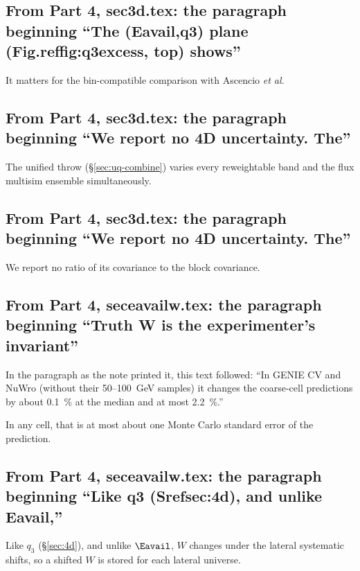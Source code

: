 \subsection{From Part 4, sec3d.tex: the paragraph beginning ``The (Eavail,q3) plane (Fig.reffig:q3excess, top) shows''}
It matters for the bin-compatible comparison with Ascencio \emph{et al.}

\subsection{From Part 4, sec3d.tex: the paragraph beginning ``We report no 4D uncertainty. The''}
The unified throw (\S\ref{sec:uq-combine}) varies every reweightable band and the flux multisim ensemble simultaneously.

\subsection{From Part 4, sec3d.tex: the paragraph beginning ``We report no 4D uncertainty. The''}
We report no ratio of its covariance to the block covariance.

\subsection{From Part 4, seceavailw.tex: the paragraph beginning ``Truth W is the experimenter's invariant''}
In the paragraph as the note printed it, this text followed: ``In GENIE CV and NuWro (without their 50--\SI{100}{GeV} samples) it changes the coarse-cell predictions by about \SI{0.1}{\percent} at the median and at most \SI{2.2}{\percent}.''\par
In any cell, that is at most about one Monte Carlo standard error of the prediction.

\subsection{From Part 4, seceavailw.tex: the paragraph beginning ``Like q3 (Srefsec:4d), and unlike Eavail,''}
Like $q_{3}$ (\S\ref{sec:4d}), and unlike $\Eavail$, $W$ changes under the lateral systematic shifts, so a shifted $W$ is stored for each lateral universe.

